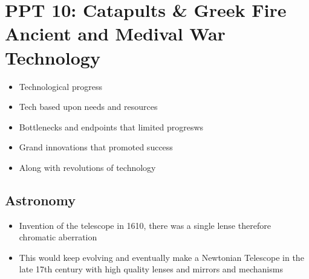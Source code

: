 \documentclass{article}
\begin{document}
\section{PPT 10: Catapults \& Greek Fire\\
Ancient and Medival War Technology}

\begin{itemize}
  \item Technological progress
  \item Tech based upon needs and resources
  \item Bottlenecks and endpoints that limited progresws
  \item Grand innovations that promoted success
  \item Along with revolutions of technology
\end{itemize}

\subsection{Astronomy}
\begin{itemize}
  \item Invention of the telescope in 1610,
    there was a single lense therefore chromatic aberration
  \item This would keep evolving and eventually make a Newtonian Telescope in the late 17th century
    with high quality lenses and mirrors and mechanisms
\end{itemize}
\end{document}
